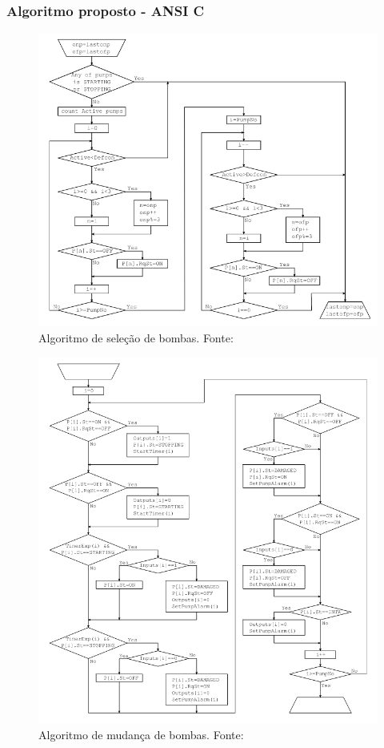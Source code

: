 \documentclass{beamer}
\begin{document}
  \begin{frame}
    \frametitle{Algoritmo proposto - ANSI C}
    \begin{minipage}{0.45\textwidth}
      \begin{figure}
        \includegraphics[width=\textwidth]{select_pumps_ansi.png}
        \caption{Algoritmo de seleção de bombas. Fonte: \cite{pumps}}
        \label{fig:ams}
      \end{figure}
    \end{minipage}
    \hfill
    \begin{minipage}{0.5\textwidth}\raggedleft
      \begin{figure}
        \includegraphics[width=\textwidth]{switch_pumps_ansi.png}
        \caption{Algoritmo de mudança de bombas. Fonte: \cite{pumps}}
        \label{fig:ams}


\end{figure}
\end{minipage}
\end{frame}
\end{document}
